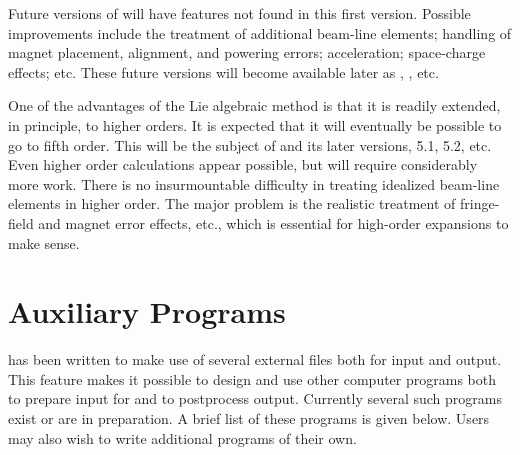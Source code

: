      Future versions of \Mary will have features not found in this first version.
Possible improvements include the treatment of additional beam-line elements;
handling of magnet placement, alignment, and powering errors; acceleration;
space-charge effects; etc.  These future versions will become available later as
, , etc.

     One of the advantages of the Lie algebraic method is that it is readily
extended, in principle, to higher orders.  It is expected that it will eventually
be possible to go to fifth order.  This will be the subject of  and its
later versions, 5.1, 5.2, etc.  Even higher order calculations appear possible,
but will require considerably more work.  There is no insurmountable difficulty in treating idealized beam-line elements in higher order.  The major problem is the realistic treatment of fringe-field and magnet error effects, etc., which is essential for high-order expansions to make sense.


\section{Auxiliary Programs}
\Mary has been written to make use of several external files both for input and
output.  This feature makes it possible to design and use other computer programs
both to prepare input for \Mary and to postprocess \Mary output.  Currently
several such programs exist or are in preparation.  A brief list of these programs
is given below.  Users may also wish to write additional programs of their own.

